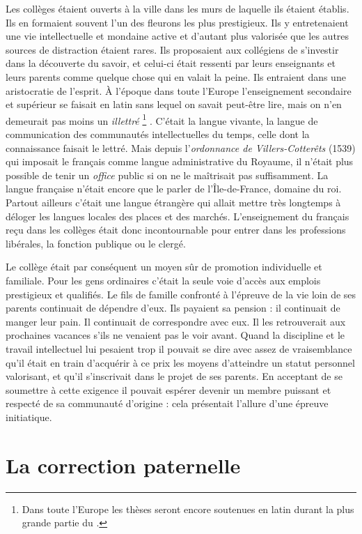 Les collèges étaient ouverts à la ville dans les murs de laquelle ils étaient établis. Ils en formaient souvent l'un des fleurons les plus prestigieux. Ils y entretenaient une vie intellectuelle et mondaine active et d'autant plus valorisée que les autres sources de distraction étaient rares. Ils proposaient aux collégiens de s'investir dans la découverte du savoir, et celui-ci était ressenti par leurs enseignants et leurs parents comme quelque chose qui en valait la peine. Ils entraient dans une aristocratie de l'esprit. À l'époque dans toute l'Europe l'enseignement secondaire et supérieur se faisait en latin sans lequel on savait peut-être lire, mais on n'en demeurait pas moins un \emph{illettré}%
\footnote{Dans toute l'Europe les thèses seront encore soutenues en latin durant la plus grande partie du .}%
. C'était la langue vivante, la langue de communication des communautés intellectuelles du temps, celle dont la connaissance faisait le lettré. Mais depuis l'\emph{ordonnance de Villers-Cotterêts} (1539) qui imposait le français comme langue administrative du Royaume, il n'était plus possible de tenir un \emph{office} public si on ne le maîtrisait pas suffisamment. La langue française n'était encore que le parler de l'Île-de-France, domaine du roi. Partout ailleurs c'était une langue étrangère qui allait mettre très longtemps à déloger les langues locales des places et des marchés. L'enseignement du français reçu dans les collèges était donc incontournable pour entrer dans les professions libérales, la fonction publique ou le clergé. 

 Le collège était par conséquent un moyen sûr de promotion individuelle et familiale. Pour les gens ordinaires c'était la seule voie d'accès aux emplois prestigieux et qualifiés. Le fils de famille confronté à l'épreuve de la vie loin de ses parents continuait de dépendre d'eux. Ils payaient sa pension : il continuait de manger leur pain. Il continuait de correspondre avec eux. Il les retrouverait aux prochaines vacances s'ils ne venaient pas le voir avant. Quand la discipline et le travail intellectuel lui pesaient trop il pouvait se dire avec assez de vraisemblance qu'il était en train d'acquérir à ce prix les moyens d'atteindre un statut personnel valorisant, et qu'il s'inscrivait dans le projet de ses parents. En acceptant de se soumettre à cette exigence il pouvait espérer devenir un membre puissant et respecté de sa communauté d'origine : cela présentait l'allure d'une épreuve initiatique. 

\section{La correction paternelle}

